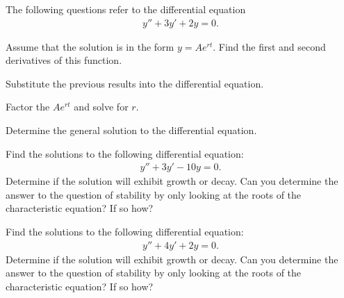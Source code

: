   \begin{problem}

  \item The following questions refer to the  differential
    equation
    \begin{eqnarray}
      y'' + 3 y' + 2 y = 0.
    \end{eqnarray}
    \begin{subproblem}
    \item Assume that the solution is in the form $y=Ae^{rt}$. Find
      the first and second derivatives of this function.
      \vfill

    \item Substitute the previous results into the differential equation.
      \vfill
      
    \item Factor the $Ae^{rt}$ and solve for $r$.
      \vfill

    \item Determine the general solution to the differential equation.
      \vfill
    
    \end{subproblem}


 
    \clearpage


  \item Find the solutions to the following differential equation:
    \begin{eqnarray}
      y'' + 3y' - 10y = 0.
    \end{eqnarray}
    Determine if the solution will exhibit growth or decay. Can you
    determine the answer to the question of stability by only looking
    at the roots of the characteristic equation? If so how?

    \vfill

  \clearpage


  \item Find the solutions to the following differential equation:
    \begin{eqnarray}
      y'' + 4y' + 2y = 0.
    \end{eqnarray}
    Determine if the solution will exhibit growth or decay. Can you
    determine the answer to the question of stability by only looking
    at the roots of the characteristic equation? If so how?

    \vfill
  \end{problem}


